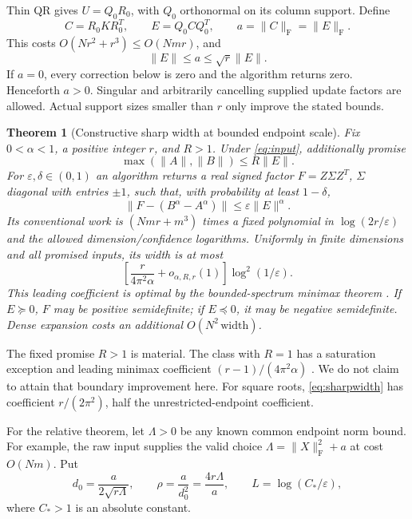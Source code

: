 \documentclass[11pt]{article}
\newtheorem{theorem}{Theorem}[section]
\numberwithin{equation}{section}
\newcommand{\Frob}{\mathrm F}
\begin{document}
Thin QR gives $U=Q_0R_0$, with $Q_0$ orthonormal on its column support.
Define
\begin{equation}\label{eq:intrinsic}
 C=R_0KR_0^T,\qquad E=Q_0CQ_0^T,\qquad
 a=\|C\|_{\Frob}=\|E\|_{\Frob}.
\end{equation}
This costs $O(Nr^2+r^3)\le O(Nmr)$, and
\begin{equation}\label{eq:anorm}
 \|E\|\le a\le\sqrt r\|E\|.
\end{equation}
If $a=0$, every correction below is zero and the algorithm returns zero.
Henceforth $a>0$. Singular and arbitrarily cancelling supplied update
factors are allowed. Actual support sizes smaller than $r$ only improve
the stated bounds.

\begin{theorem}[Constructive sharp width at bounded endpoint scale]
\label{thm:bounded}
Fix $0<\alpha<1$, a positive integer $r$, and $R>1$. Under
\eqref{eq:input}, additionally promise
\begin{equation}\label{eq:Rpromise}
 \max(\|A\|,\|B\|)\le R\|E\|.
\end{equation}
For $\varepsilon,\delta\in(0,1)$ an algorithm returns a real signed
factor $F=Z\Sigma Z^T$, $\Sigma$ diagonal with entries $\pm1$, such
that, with probability at least $1-\delta$,
\[
 \|F-(B^\alpha-A^\alpha)\|\le\varepsilon\|E\|^\alpha.
\]
Its conventional work is
$(Nmr+m^3)$ times a fixed polynomial in $\log(2r/\varepsilon)$ and
the allowed dimension/confidence logarithms. Uniformly in finite
dimensions and all promised inputs, its width is at most
\begin{equation}\label{eq:sharpwidth}
 \left[\frac{r}{4\pi^2\alpha}+o_{\alpha,R,r}(1)\right]
                                      \log^2(1/\varepsilon).
\end{equation}
This leading coefficient is optimal by the bounded-spectrum minimax
theorem \cite{Bounded}. If $E\succeq0$, $F$ may be positive
semidefinite; if $E\preceq0$, it may be negative semidefinite.
Dense expansion costs an additional $O(N^2\,\mathrm{width})$.
\end{theorem}

The fixed promise $R>1$ is material. The class with $R=1$ has a
saturation exception and leading minimax coefficient
$(r-1)/(4\pi^2\alpha)$ \cite{Bounded}. We do not claim to attain that
boundary improvement here. For square roots, \eqref{eq:sharpwidth}
has coefficient $r/(2\pi^2)$, half the unrestricted-endpoint coefficient.

For the relative theorem, let $\Lambda>0$ be any known common endpoint
norm bound. For example, the raw input supplies the valid choice
$\Lambda=\|X\|_{\Frob}^2+a$ at cost $O(Nm)$. Put
\begin{equation}\label{eq:relative-scales}
 d_0=\frac{a}{2\sqrt{r\Lambda}},\qquad
 \rho=\frac{a}{d_0^2}=\frac{4r\Lambda}{a},\qquad
 L=\log(C_*/\varepsilon),
\end{equation}
where $C_*>1$ is an absolute constant.
\end{document}
